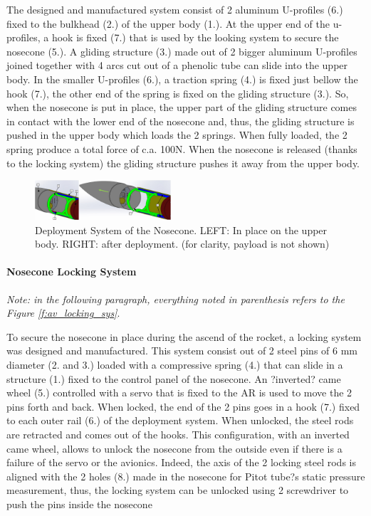 The designed and manufactured system consist of 2 aluminum U-profiles (6.) fixed to the bulkhead (2.) of the upper body (1.). At the upper end of the u-profiles, a hook is fixed (7.) that is used by the looking system to secure the nosecone (5.). A gliding structure (3.) made out of 2 bigger aluminum U-profiles joined together with 4 arcs cut out of a phenolic tube can slide into the upper body.
In the smaller U-profiles (6.), a traction spring (4.) is fixed just bellow the hook (7.), the other end of the spring is fixed on the gliding structure (3.). So, when the nosecone is put in place, the upper part of the gliding structure comes in contact with the lower end of the nosecone and, thus, the gliding structure is pushed in the upper body which loads the 2 springs. When fully loaded, the 2 spring produce a total force of c.a. 100N. When the nosecone is released (thanks to the locking system) the gliding structure pushes it away from the upper body.

  \begin{figure}[h!]
 	\centering
        \includegraphics[width=0.45\textwidth]{img/AV_FIG_CAD_depl_sys_1.jpg}
        \caption{Deployment System of the Nosecone. LEFT: In place on the upper body. RIGHT: after deployment. (for clarity, payload is not shown)}
        \label{f:av_deployment_sys}
 \end{figure}

\paragraph{Nosecone Locking System}
 \hfill \break
\textit{Note: in the following paragraph, everything noted in parenthesis refers to the Figure \ref{f:av_locking_sys}}.

To secure the nosecone in place during the ascend of the rocket, a locking system was designed and manufactured. This system consist out of 2 steel pins of 6 mm diameter (2. and 3.) loaded with a compressive spring (4.) that can slide in a structure (1.) fixed to the control panel of the nosecone. An ?inverted? came wheel (5.) controlled with a servo that is fixed to the AR is used to move the 2 pins forth and back. When locked, the end of the 2 pins goes in a hook (7.) fixed to each outer rail (6.) of the
deployment system. When unlocked, the steel rods are retracted and comes out of the hooks. 
This configuration, with an inverted came wheel, allows to unlock the nosecone from the outside even if there is a failure of the servo or the avionics. Indeed, the axis of the 2 locking steel rods is aligned with the 2 holes (8.) made in the nosecone for Pitot tube?s static pressure measurement, thus, the locking system can be unlocked using 2 screwdriver to push the pins inside the nosecone

